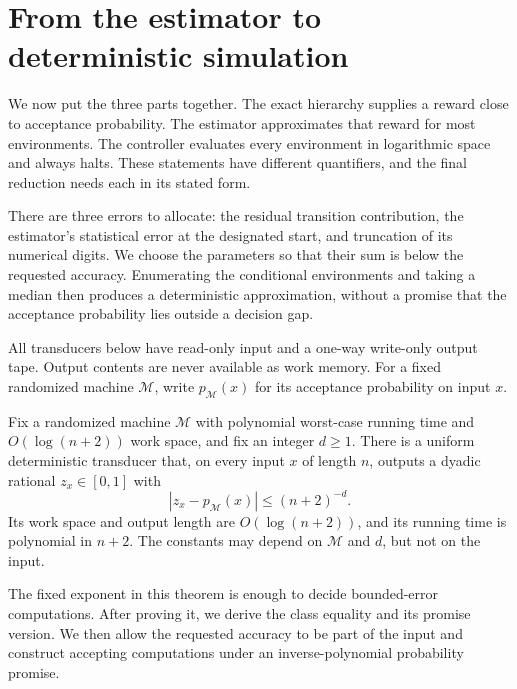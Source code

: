 \section{From the estimator to deterministic simulation}
\label{sec:conclusion}

We now put the three parts together. The exact hierarchy supplies a reward close to acceptance probability. The estimator approximates that reward for most environments. The controller evaluates every environment in logarithmic space and always halts. These statements have different quantifiers, and the final reduction needs each in its stated form.

There are three errors to allocate: the residual transition contribution, the estimator's statistical error at the designated start, and truncation of its numerical digits. We choose the parameters so that their sum is below the requested accuracy. Enumerating the conditional environments and taking a median then produces a deterministic approximation, without a promise that the acceptance probability lies outside a decision gap.

All transducers below have read-only input and a one-way write-only
output tape. Output contents are never available as work memory.
For a fixed randomized machine $\mathcal M$, write
$p_{\mathcal M}(x)$ for its acceptance probability on input $x$.

\begin{theorem}
\label{thm:fixed-precision}
Fix a randomized machine $\mathcal M$ with polynomial worst-case
running time and $O(\log(n+2))$ work space, and fix an integer $d\ge1$.
There is a uniform deterministic transducer that, on every input $x$
of length $n$, outputs a dyadic rational $z_x\in[0,1]$ with
\[
 |z_x-p_{\mathcal M}(x)|\le(n+2)^{-d}.
\]
Its work space and output length are $O(\log(n+2))$, and its running
time is polynomial in $n+2$. The constants may depend on
$\mathcal M$ and $d$, but not on the input.
\end{theorem}

The fixed exponent in this theorem is enough to decide bounded-error
computations. After proving it, we derive the class equality and its
promise version. We then allow the requested accuracy to be part of the
input and construct accepting computations under an inverse-polynomial
probability promise.

